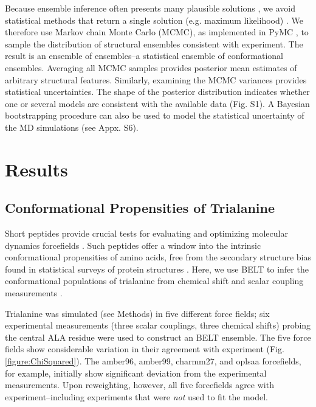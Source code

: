 \documentclass[journal=jacsat,manuscript=article]{achemso}
\begin{document}
Because ensemble inference often presents many plausible solutions \cite{fisher2010, rieping2005}, we avoid statistical methods that return a single solution (e.g. maximum likelihood) .  We therefore use Markov chain Monte Carlo (MCMC), as implemented in PyMC \cite{patil2010pymc}, to sample the distribution of structural ensembles consistent with experiment.  The result is an ensemble of ensembles--a statistical ensemble of conformational ensembles.  Averaging all MCMC samples provides posterior mean  estimates of arbitrary structural features.  Similarly, examining the MCMC variances provides statistical uncertainties.  The shape of the posterior distribution indicates whether one or several models are consistent with the available data (Fig. S1).  A Bayesian bootstrapping procedure \cite{rubin1981} can also be used to model the statistical uncertainty of the MD simulations (see Appx. S6).

\section{Results}

\subsection{Conformational Propensities of Trialanine}

Short peptides provide crucial tests for evaluating and optimizing molecular dynamics forcefields \cite{Graf2007,beauchamp2012protein, Nerenberg2011, Best2008, Grdadolnik2011}.  Such peptides offer a window into the intrinsic conformational propensities of amino acids, free from the secondary structure bias found in statistical surveys of protein structures \cite{Jha2005}.  Here, we use BELT to infer the conformational populations of trialanine from chemical shift and scalar coupling measurements \cite{Graf2007}.  

Trialanine was simulated (see Methods) in five different force fields; six experimental measurements (three scalar couplings, three chemical shifts) probing the central ALA residue were used to construct an BELT ensemble.  The five force fields show considerable variation in their agreement with experiment (Fig. \ref{figure:ChiSquared}).  The amber96, amber99, charmm27, and oplsaa forcefields, for example, initially show significant deviation from the experimental measurements.  Upon reweighting, however, all five forcefields agree with experiment--including experiments that were \emph{not} used to fit the model.  
\end{document}
